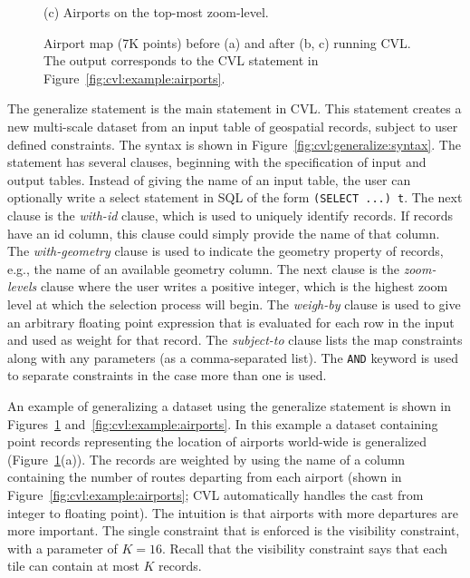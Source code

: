 \documentclass[11pt, oneside]{report}
\begin{document}
{\begin{figure}[tb]
\begin{minipage}{0.329\linewidth}
    \centerline{(c) Airports on the top-most zoom-level.}
  \end{minipage}
  \vspace{-0ex}
  \caption{Airport map (7K points) before (a) and after (b, c) running CVL. The output corresponds to the CVL statement in Figure~\ref{fig:cvl:example:airports}.}
  \label{fig:cvl:visualization:airport}
  \vspace{-2ex}
\end{figure}

The generalize statement is the main statement in CVL. This statement creates a new multi-scale dataset from an input table of geospatial records, subject to user defined constraints. The syntax is shown in Figure~\ref{fig:cvl:generalize:syntax}. The statement has several clauses, beginning with the specification of input and output tables. Instead of giving the name of an input table, the user can optionally write a select statement in SQL of the form \texttt{(SELECT ...) t}. The next clause is the \emph{with-id} clause, which is used to uniquely identify records. If records have an id column, this clause could simply provide the name of that column. The \emph{with-geometry} clause is used to indicate the geometry property of records, e.g., the name of an available geometry column. The next clause is the \emph{zoom-levels} clause where the user writes a positive integer, which is the highest zoom level at which the selection process will begin. The \emph{weigh-by} clause is used to give an arbitrary floating point expression that is evaluated for each row in the input and used as weight for that record. The \emph{subject-to} clause lists the map constraints along with any parameters (as a comma-separated list). The \texttt{AND} keyword is used to separate constraints in the case more than one is used.



An example of generalizing a dataset using the generalize statement is shown in Figures~\ref{fig:cvl:visualization:airport} and~\ref{fig:cvl:example:airports}. In this example a dataset containing point records representing the location of airports world-wide is generalized (Figure~\ref{fig:cvl:visualization:airport}(a)). The records are weighted by using the name of a column containing the number of routes departing from each airport (shown in Figure~\ref{fig:cvl:example:airports}; CVL automatically handles the cast from integer to floating point). The intuition is that airports with more departures are more important. The single constraint that is enforced is the visibility constraint, with a parameter of $K=16$. Recall that the visibility constraint says that each tile can contain at most $K$ records.


}
\end{document}
